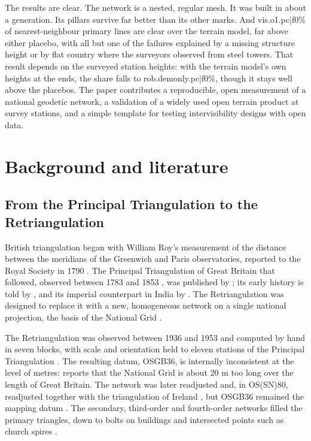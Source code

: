 \documentclass[11pt,a4paper]{article}
\begin{document}
The results are clear. The network is a nested, regular mesh. It was built in about a generation. Its pillars survive far better than its other marks. And {{vis.o1.pc|f0}}\% of nearest-neighbour primary lines are clear over the terrain model, far above either placebo, with all but one of the failures explained by a missing structure height or by flat country where the surveyors observed from steel towers. That result depends on the surveyed station heights: with the terrain model's own heights at the ends, the share falls to {{rob.demonly.pc|f0}}\%, though it stays well above the placebos. The paper contributes a reproducible, open measurement of a national geodetic network, a validation of a widely used open terrain product at survey stations, and a simple template for testing intervisibility designs with open data.

\section{Background and literature}\label{sec:lit}
\subsection{From the Principal Triangulation to the Retriangulation}
British triangulation began with William Roy's measurement of the distance between the meridians of the Greenwich and Paris observatories, reported to the Royal Society in 1790 \citep{roy1790}. The Principal Triangulation of Great Britain that followed, observed between 1783 and 1853 \citep{osblog2016}, was published by \citet{clarke1858}; its early history is told by \citet{hewitt2010}, and its imperial counterpart in India by \citet{edney1997}. The Retriangulation was designed to replace it with a new, homogeneous network on a single national projection, the basis of the National Grid \citep{os1967,seymour1980,owen1992}.

The Retriangulation was observed between 1936 and 1953 and computed by hand in seven blocks, with scale and orientation held to eleven stations of the Principal Triangulation \citep{greaves2004}. The resulting datum, OSGB36, is internally inconsistent at the level of metres: \citet{greaves2004} reports that the National Grid is about 20 m too long over the length of Great Britain. The network was later readjusted \citep{ashkenazi1972} and, in OS(SN)80, readjusted together with the triangulation of Ireland \citep{ashkenazi1983}, but OSGB36 remained the mapping datum \citep{greaves2004}. The secondary, third-order and fourth-order networks filled the primary triangles, down to bolts on buildings and intersected points such as church spires \citep{seymour1980,owen1992}.
\end{document}
